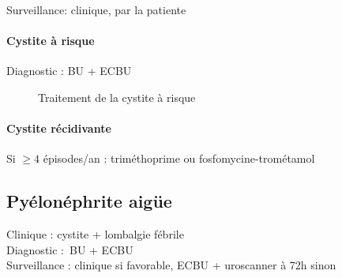Surveillance: clinique, par la patiente

\paragraph{Cystite à risque}
Diagnostic : BU + ECBU

\begin{figure}[htpb]
  \centering

  \caption{Traitement de la cystite à risque}
\end{figure}

\paragraph{Cystite récidivante}%
\label{ssub:cystite_recidivante}

Si $\ge 4$ épisodes/an : triméthoprime ou fosfomycine-trométamol

\subsection{Pyélonéphrite aigüe}%
\label{sub:pyelonephite_aigue}
Clinique : cystite + lombalgie fébrile\\
Diagnostic : BU + ECBU\\
Surveillance : clinique si favorable, ECBU + uroscanner à 72h sinon

